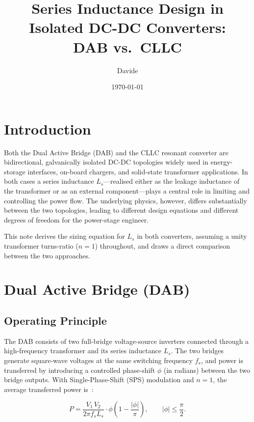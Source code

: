 \documentclass[a4paper, 11pt]{article}
\title{\textbf{Series Inductance Design in Isolated DC-DC Converters:\\
		DAB vs.\ CLLC}}
\author{Davide}
\date{\today}
\begin{document}
	\maketitle
	\tableofcontents
	\bigskip
	
	\section{Introduction}
	
	Both the Dual Active Bridge (DAB) and the CLLC resonant converter are
	bidirectional, galvanically isolated DC-DC topologies widely used in
	energy-storage interfaces, on-board chargers, and solid-state
	transformer applications.  In both cases a series inductance
	$L_s$—realised either as the leakage inductance of the transformer or
	as an external component—plays a central role in limiting and
	controlling the power flow.  The underlying physics, however, differs
	substantially between the two topologies, leading to different design
	equations and different degrees of freedom for the power-stage
	engineer.
	
	This note derives the sizing equation for $L_s$ in both converters,
	assuming a unity transformer turns-ratio ($n = 1$) throughout, and
	draws a direct comparison between the two approaches.
	
	\section{Dual Active Bridge (DAB)}
	
	\subsection{Operating Principle}
	
	The DAB consists of two full-bridge voltage-source inverters connected
	through a high-frequency transformer and its series inductance $L_s$.
	The two bridges generate square-wave voltages at the same switching
	frequency $f_s$, and power is transferred by introducing a controlled
	phase-shift $\phi$ (in radians) between the two bridge outputs.  With
	Single-Phase-Shift (SPS) modulation and $n = 1$, the average
	transferred power is~\cite{dedoncker1991}:
	
	\begin{equation}
		P = \frac{V_1 \, V_2}{2\pi f_s L_s}
		\cdot \phi \!\left(1 - \frac{|\phi|}{\pi}\right),
		\qquad |\phi| \leq \frac{\pi}{2}.
		\label{eq:dab_power}
	\end{equation}
	
\end{document}
